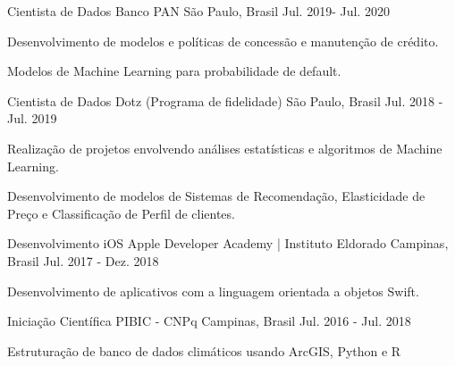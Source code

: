 \begin{cventries}
    \cventry
    {Cientista de Dados}
    {Banco PAN}
    {São Paulo, Brasil}
    {Jul. 2019- Jul. 2020}
    {
      \begin{cvitems}
        \item {Desenvolvimento de modelos e políticas de concessão e manutenção de crédito. }
        \item {Modelos de Machine Learning para probabilidade de default. }
      \end{cvitems}
    }

    \cventry
    {Cientista de Dados}
    {Dotz (Programa de fidelidade)}
    {São Paulo, Brasil}
    {Jul. 2018 - Jul. 2019}
    {
      \begin{cvitems}
        \item {Realização de projetos envolvendo análises estatísticas e algoritmos de Machine Learning. }
        \item {Desenvolvimento de modelos de Sistemas de Recomendação, Elasticidade de Preço e Classificação de Perfil de clientes. }
      \end{cvitems}
    }

    \cventry
    {Desenvolvimento iOS}
    {Apple Developer Academy | Instituto Eldorado}
    {Campinas, Brasil}
    {Jul. 2017 - Dez. 2018}
    {
      \begin{cvitems}
        \item {Desenvolvimento de aplicativos com a linguagem orientada a objetos Swift.}
      \end{cvitems}
    }

    \cventry
      {Iniciação Científica}
      {PIBIC - CNPq}
      {Campinas, Brasil}
      {Jul. 2016 - Jul. 2018}
      {
        \begin{cvitems}
          \item {Estruturação de banco de dados climáticos usando ArcGIS, Python e R}
        \end{cvitems}
      }
\end{cventries}
